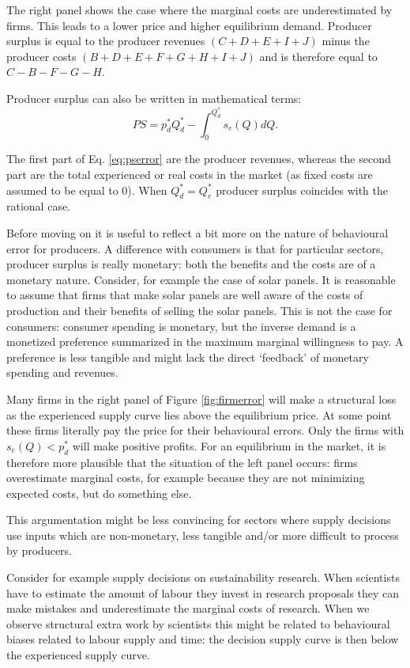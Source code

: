 \documentclass[
]{book}
\begin{document}
The right panel shows the case where the marginal costs are underestimated by firms. This leads to a lower price and higher equilibrium demand. Producer surplus is equal to the producer revenues \((C+D+E+I+J)\) minus the producer costs \((B+D+E+F+G+H+I+J)\) and is therefore equal to \(C-B-F-G-H\).

Producer surplus can also be written in mathematical terms:
\begin{equation}
PS = p_d^* Q_d^* - \int_0^{Q_d^*} s_e(Q)dQ.
\label{eq:pserror}
\end{equation}

The first part of Eq. \eqref{eq:pserror} are the producer revenues, whereas the second part are the total experienced or real costs in the market (as fixed costs are assumed to be equal to 0). When \(Q_d^* = Q_e^*\) producer surplus coincides with the rational case.

Before moving on it is useful to reflect a bit more on the nature of behavioural error for producers. A difference with consumers is that for particular sectors, producer surplus is really monetary: both the benefits and the costs are of a monetary nature. Consider, for example the case of solar panels. It is reasonable to assume that firms that make solar panels are well aware of the costs of production and their benefits of selling the solar panels. This is not the case for consumers: consumer spending is monetary, but the inverse demand is a monetized preference summarized in the maximum marginal willingness to pay. A preference is less tangible and might lack the direct `feedback' of monetary spending and revenues.

Many firms in the right panel of Figure \ref{fig:firmerror} will make a structural loss as the experienced supply curve lies above the equilibrium price. At some point these firms literally pay the price for their behavioural errors. Only the firms with \(s_e (Q)< p_d^*\) will make positive profits. For an equilibrium in the market, it is therefore more plausible that the situation of the left panel occurs: firms overestimate marginal costs, for example because they are not minimizing expected costs, but do something else.

This argumentation might be less convincing for sectors where supply decisions use inputs which are non-monetary, less tangible and/or more difficult to process by producers.

Consider for example supply decisions on sustainability research. When scientists have to estimate the amount of labour they invest in research proposals they can make mistakes and underestimate the marginal costs of research. When we observe structural extra work by scientists this might be related to behavioural biases related to labour supply and time: the decision supply curve is then below the experienced supply curve.
\end{document}
